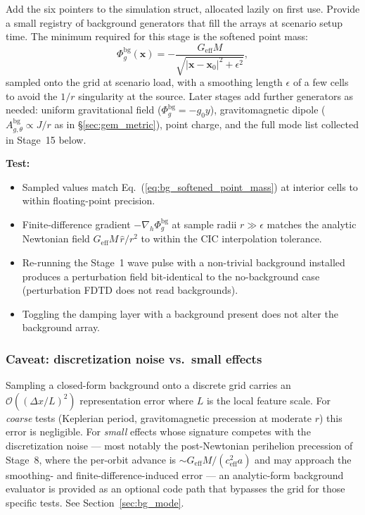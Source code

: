 \documentclass[11pt,a4paper]{article}
\newcommand{\vv}[1]{\mathbf{#1}}
\newcommand{\Phig}{\Phi_g}
\newcommand{\order}[1]{\mathcal{O}(#1)}
\begin{document}
Add the six pointers to the simulation struct, allocated lazily on first use.  Provide a small registry of background generators that fill the arrays at scenario setup time.  The minimum required for this stage is the softened point mass:
\begin{equation}
\label{eq:bg_softened_point_mass}
  \Phig^{\mathrm{bg}}(\vv{x}) = -\frac{G_{\mathrm{eff}}M}{\sqrt{|\vv{x}-\vv{x}_0|^2 + \epsilon^2}},
\end{equation}
sampled onto the grid at scenario load, with a smoothing length $\epsilon$ of a few cells to avoid the $1/r$ singularity at the source.  Later stages add further generators as needed: uniform gravitational field ($\Phig^{\mathrm{bg}}=-g_0 y$), gravitomagnetic dipole ($A_{g,\theta}^{\mathrm{bg}}\propto J/r$ as in §\ref{sec:gem_metric}), point charge, and the full mode list collected in Stage~15 below.

\textbf{Test:}
\begin{itemize}
  \item Sampled values match Eq.~(\ref{eq:bg_softened_point_mass}) at interior cells to within floating-point precision.
  \item Finite-difference gradient $-\nabla_h\Phig^{\mathrm{bg}}$ at sample radii $r\gg\epsilon$ matches the analytic Newtonian field $G_{\mathrm{eff}}M\,\hat r/r^2$ to within the CIC interpolation tolerance.
  \item Re-running the Stage~1 wave pulse with a non-trivial background installed produces a perturbation field bit-identical to the no-background case (perturbation FDTD does not read backgrounds).
  \item Toggling the damping layer with a background present does not alter the background array.
\end{itemize}

\subsubsection*{Caveat: discretization noise vs.\ small effects}

Sampling a closed-form background onto a discrete grid carries an $\order{(\Delta x/L)^2}$ representation error where $L$ is the local feature scale.  For \emph{coarse} tests (Keplerian period, gravitomagnetic precession at moderate $r$) this error is negligible.  For \emph{small} effects whose signature competes with the discretization noise --- most notably the post-Newtonian perihelion precession of Stage~8, where the per-orbit advance is $\sim G_{\mathrm{eff}}M/(c_{\mathrm{eff}}^2 a)$ and may approach the smoothing- and finite-difference-induced error --- an analytic-form background evaluator is provided as an optional code path that bypasses the grid for those specific tests.  See Section~\ref{sec:bg_mode}.
\end{document}
